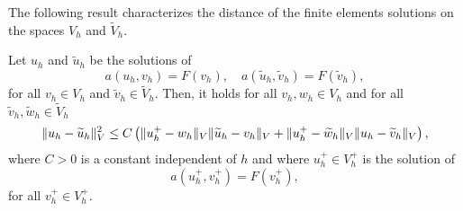 The following result characterizes the distance of the finite elements solutions on the spaces $V_h$ and $\widetilde V_h$.
\begin{lemma}\label{lem:ConvergenceGeneral} Let $u_h$ and $\widetilde u_h$ be the solutions of
	\begin{equation}
		a(u_h, v_h) = F(v_h), \quad a(\widetilde u_h, \widetilde v_h) = F(\widetilde v_h),
	\end{equation}
	for all $v_h \in V_h$ and $\widetilde v_h \in \widetilde V_h$. Then, it holds for all $v_h, w_h \in V_h$ and for all $\widetilde v_h, \widetilde w_h \in \widetilde V_h$
	\begin{equation}
	\begin{aligned}
	\lVert u_h - \widetilde u_h\rVert_V^2 \leq C \left(\lVert u_h^+ - w_h\rVert_V \lVert\widetilde u_h - v_h\rVert_V + \lVert u_h^+ - \widetilde w_h\rVert_V \lVert u_h - \widetilde v_h\rVert_V \right),
	\end{aligned}
	\end{equation}
	where $C > 0$ is a constant independent of $h$ and where $u_h^+ \in V_h^+$ is the solution of 
	\begin{equation}\label{eq:uHPlus}
		a(u_h^+ , v_h^+) = F(v_h^+),	
	\end{equation}
	for all $v_h^+ \in V_h^+$.
\end{lemma}
